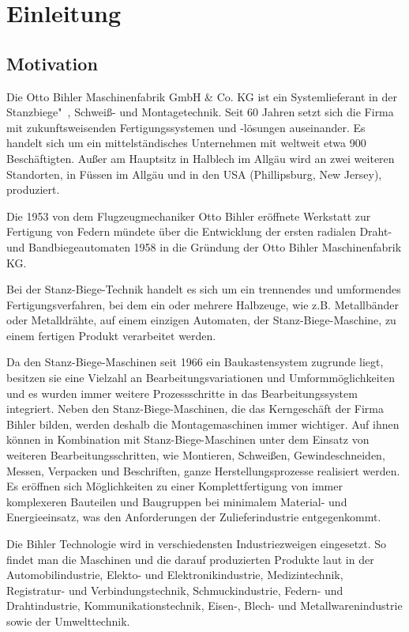 \chapter{Einleitung}


\section{Motivation}

Die Otto Bihler Maschinenfabrik GmbH \& Co. KG ist ein Systemlieferant in der Stanzbiege"~, Schweiß- und Montagetechnik. Seit 60 Jahren setzt sich die Firma mit zukunftsweisenden Fertigungssystemen und -lösungen auseinander. Es handelt sich um  ein mittelständisches Unternehmen mit weltweit etwa 900 Beschäftigten. Außer am Hauptsitz in Halblech im Allgäu wird an zwei weiteren Standorten, in Füssen im Allgäu und in den USA (Phillipsburg, New Jersey), produziert. 

Die 1953 von dem Flugzeugmechaniker Otto Bihler eröffnete Werkstatt zur Fertigung von Federn mündete über die Entwicklung der ersten radialen Draht- und Bandbiegeautomaten 1958 in die Gründung der Otto Bihler Maschinenfabrik KG. 

Bei der Stanz-Biege-Technik handelt es sich um ein trennendes und umformendes Fertigungsverfahren, bei dem ein oder mehrere Halbzeuge, wie z.B. Metallbänder oder Metalldrähte, auf einem einzigen Automaten, der Stanz-Biege-Maschine, zu einem fertigen Produkt verarbeitet werden. \cite{Hoermann2013}

Da den Stanz-Biege-Maschinen seit 1966 ein Baukastensystem zugrunde liegt, besitzen sie eine Vielzahl an Bearbeitungsvariationen und Umformmöglichkeiten und es wurden immer weitere Prozessschritte in das Bearbeitungssystem integriert. Neben den Stanz-Biege-Maschinen, die das Kerngeschäft der Firma Bihler bilden, werden deshalb die Montagemaschinen immer wichtiger. Auf ihnen können in Kombination mit Stanz-Biege-Maschinen unter dem Einsatz von weiteren Bearbeitungsschritten, wie Montieren, Schweißen, Gewindeschneiden, Messen, Verpacken und Beschriften, ganze Herstellungsprozesse realisiert werden. Es eröffnen sich Möglichkeiten zu einer Komplettfertigung von immer komplexeren Bauteilen und Baugruppen  bei minimalem Material- und Energieeinsatz, was den Anforderungen der Zulieferindustrie entgegenkommt.

Die Bihler Technologie wird in verschiedensten Industriezweigen eingesetzt. So findet man die Maschinen und die darauf produzierten Produkte laut \cite{Hoermann2013} in der Automobilindustrie, Elekto- und Elektronikindustrie, Medizintechnik, Registratur- und Verbindungstechnik, Schmuckindustrie, Federn- und Drahtindustrie, Kommunikationstechnik, Eisen-, Blech- und Metallwarenindustrie sowie der Umwelttechnik.


